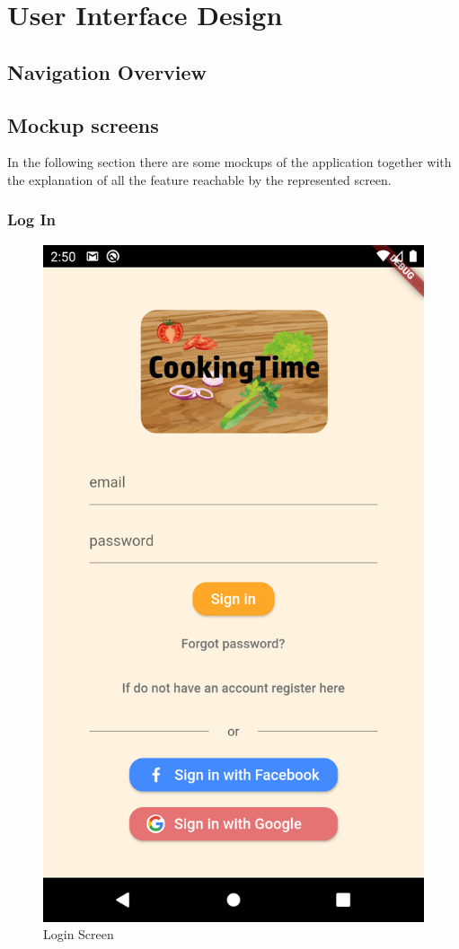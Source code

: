 \chapter{User Interface Design}

\section{Navigation Overview}

\section{Mockup screens}
In the following section there are some mockups of the application together with the explanation of all the feature reachable by the represented screen.

\subsection{Log In}
\begin{figure}[H]
	\centering
	\includegraphics{img/SignIn.png}
	\caption{Login Screen}
\end{figure}
